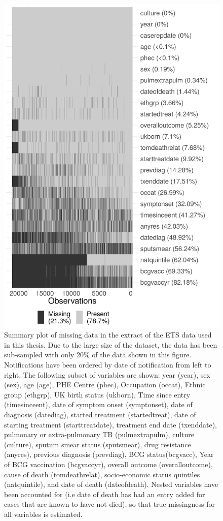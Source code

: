 \documentclass[11pt,twoside]{bristolthesis}
\begin{document}
  \newpage
  \begin{figure}
  
  {\centering \includegraphics[width=0.6\linewidth,]{chapters/tb-epi-england/figures/plot-missing-struct} 
  
  }
  
  \caption[Summary plot of missing data in the extract of the ETS data used in this thesis.]{Summary plot of missing data in the extract of the ETS data used in this thesis. Due to the large size of the dataset, the data has been sub-sampled with only 20\% of the data shown in this figure. Notifications have been ordered by date of notification from left to right. The following subset of variables are shown: year (year), sex (sex), age (age), PHE Centre (phec), Occupation (occat), Ethnic group (ethgrp), UK birth status (ukborn), Time since entry (timesinceent), date of symptom onset (symptonset), date of diagnosis (datediag), started treatment (startedtreat), date of starting treatment (starttreatdate), treatment end date (txenddate), pulmonary or extra-pulmonary TB (pulmextrapulm), culture (culture), sputum smear status (sputsmear), drug resistance (anyres), previous diagnosis (prevdiag), BCG status(bcgvacc), Year of BCG vaccination (bcgvaccyr), overall outcome (overalloutcome), cause of death (tomdeathrelat), socio-economic status quintiles (natquintile), and date of death (dateofdeath). Nested variables have been accounted for (i.e date of death has had an entry added for cases that are known to have not died), so that true missingness for all variables is estimated.}\label{fig:plot-missing-struct}
  \end{figure}
\end{document}
